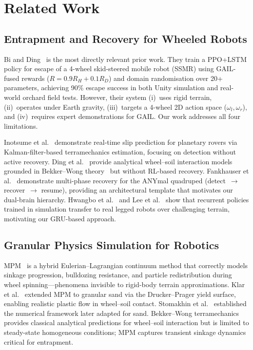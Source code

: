 \documentclass[conference]{IEEEtran}
\begin{document}
\section{Related Work}
\label{sec:related}

\subsection{Entrapment and Recovery for Wheeled Robots}

Bi and Ding~\cite{bi2026escape} is the most directly relevant prior work.
They train a PPO+LSTM policy for escape of a 4-wheel skid-steered mobile robot
(SSMR) using GAIL-fused rewards ($R = 0.9R_H + 0.1R_D$) and domain
randomisation over 20+ parameters, achieving 90\% escape success in both Unity
simulation and real-world orchard field tests. However, their system
(i)~uses rigid terrain, (ii)~operates under Earth gravity,
(iii)~targets a 4-wheel 2D action space ($\omega_l, \omega_r$), and
(iv)~requires expert demonstrations for GAIL. Our work addresses all four limitations.

Inotsume et al.~\cite{inotsume2020} demonstrate real-time slip prediction for
planetary rovers via Kalman-filter-based terramechanics estimation, focusing on
detection without active recovery. Ding et al.~\cite{ding2011} provide analytical
wheel--soil interaction models grounded in Bekker--Wong theory~\cite{bekker1960}
but without RL-based recovery. Fankhauser et al.~\cite{fankhauser2018} demonstrate multi-phase recovery for
the ANYmal quadruped (detect~$\to$ recover~$\to$ resume), providing an
architectural template that motivates our dual-brain hierarchy. Hwangbo et
al.~\cite{hwangbo2019anymal} and Lee et al.~\cite{lee2020quadruped} show that
recurrent policies trained in simulation transfer to real legged robots over
challenging terrain, motivating our GRU-based approach.

\subsection{Granular Physics Simulation for Robotics}

MPM~\cite{sulsky1994particle} is a hybrid Eulerian--Lagrangian continuum method
that correctly models sinkage progression, bulldozing resistance, and particle
redistribution during wheel spinning---phenomena invisible to rigid-body terrain
approximations. Klar et al.~\cite{klar2016sand} extended MPM to granular sand
via the Drucker--Prager yield surface, enabling realistic plastic flow in
wheel--soil contact. Stomakhin et al.~\cite{stomakhin2013snow} established the
numerical framework later adapted for sand. Bekker--Wong
terramechanics~\cite{bekker1960} provides classical analytical predictions for
wheel--soil interaction but is limited to steady-state homogeneous conditions;
MPM captures transient sinkage dynamics critical for entrapment.
\end{document}

